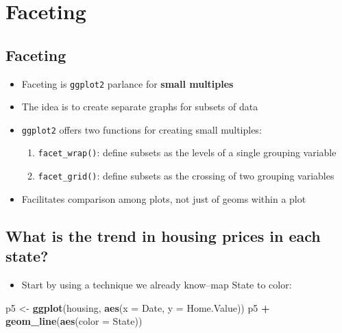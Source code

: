 \documentclass[]{book}
\newenvironment{Shaded}{\begin{snugshade}}{\end{snugshade}}
\newcommand{\KeywordTok}[1]{\textcolor[rgb]{0.13,0.29,0.53}{\textbf{#1}}}
\newcommand{\DataTypeTok}[1]{\textcolor[rgb]{0.13,0.29,0.53}{#1}}
\newcommand{\StringTok}[1]{\textcolor[rgb]{0.31,0.60,0.02}{#1}}
\newcommand{\OperatorTok}[1]{\textcolor[rgb]{0.81,0.36,0.00}{\textbf{#1}}}
\newcommand{\NormalTok}[1]{#1}
\providecommand{\tightlist}{%
  \setlength{\itemsep}{0pt}\setlength{\parskip}{0pt}}
\begin{document}
\section{Faceting}\label{faceting}

\subsection{Faceting}\label{faceting-1}

\begin{itemize}
\tightlist
\item
  Faceting is \texttt{ggplot2} parlance for \textbf{small multiples}
\item
  The idea is to create separate graphs for subsets of data
\item
  \texttt{ggplot2} offers two functions for creating small multiples:

  \begin{enumerate}
  \def\labelenumi{\arabic{enumi}.}
  \tightlist
  \item
    \texttt{facet\_wrap()}: define subsets as the levels of a single
    grouping variable
  \item
    \texttt{facet\_grid()}: define subsets as the crossing of two
    grouping variables
  \end{enumerate}
\item
  Facilitates comparison among plots, not just of geoms within a plot
\end{itemize}

\subsection{What is the trend in housing prices in each
state?}\label{what-is-the-trend-in-housing-prices-in-each-state}

\begin{itemize}
\tightlist
\item
  Start by using a technique we already know--map State to color:
\end{itemize}

\begin{Shaded}
\begin{Highlighting}[]
\NormalTok{p5 <-}\StringTok{ }\KeywordTok{ggplot}\NormalTok{(housing, }\KeywordTok{aes}\NormalTok{(}\DataTypeTok{x =}\NormalTok{ Date, }\DataTypeTok{y =}\NormalTok{ Home.Value))}
\NormalTok{p5 }\OperatorTok{+}\StringTok{ }\KeywordTok{geom_line}\NormalTok{(}\KeywordTok{aes}\NormalTok{(}\DataTypeTok{color =}\NormalTok{ State))  }
\end{Highlighting}
\end{Shaded}
\end{document}
